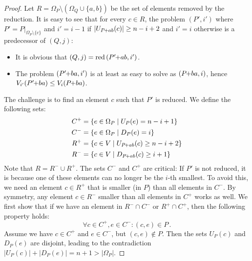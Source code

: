 \documentclass[twoside,leqno,twocolumn]{article}
\newcommand{\pchild}[3]{{#1}\kern-1pt{+}{#2}{#3}}
\newcommand{\reduced}[1]{\operatorname{red}{#1}}
\newcommand{\less}[2]{D_{#1}(#2)}
\newcommand{\greater}[2]{U_{#1}(#2)}
\begin{document}
\begin{proof}
  Let $R = \Omega_P \setminus (\Omega_Q \cup \{a, b\})$ be the set of elements removed by the reduction.
  It is easy to see that for every $c \in R$, the problem $(P', i')$ where $P' = P|_{\Omega_P \setminus \{c\}}$ and $i' = i - 1$ if $|\greater{\pchild{P}{a}{b}}{c}| \ge n - i + 2$ and $i' = i$ otherwise is a predecessor of $(Q, j)$:
  \begin{itemize}
    \item It is obvious that $(Q, j) = \reduced{(\pchild{P'}{a}{b}, i')}$.
    \item The problem $(\pchild{P'}{b}{a}, i')$ is at least as easy to solve as $(\pchild{P}{b}{a}, i)$, hence $V_{i'}(\pchild{P'}{b}{a}) \leq V_i(\pchild{P}{b}{a})$.
  \end{itemize}
  The challenge is to find an element $c$ such that $P'$ is reduced.
  We define the following sets:
  \begin{align*}
    C^+ & = \{e \in \Omega_P \mid \greater{P}{e} = n - i + 1\}            \\
    C^- & = \{e \in \Omega_P \mid \less{P}{e} = i \}                      \\
    R^+ & = \{c \in V \mid \greater{\pchild{P}{a}{b}}{c} \ge n - i + 2 \} \\
    R^- & = \{c \in V \mid \less{\pchild{P}{a}{b}}{c} \ge i + 1 \}
  \end{align*}
  Note that $R = R^- \cup R^+$.
  The sets $C^-$ and $C^+$ are critical:
  If $P'$ is not reduced, it is because one of these elements can no longer be the $i$-th smallest.
  To avoid this, we need an element $c \in R^+$ that is smaller (in $P$) than all elements in $C^-$.
  By symmetry, any element $c \in R^-$ smaller than all elements in $C^+$ works as well.
  We first show that if we have an element in $R^- \cap C^-$ or $R^+ \cap C^+$, then the following property holds:
  \begin{equation}
    \forall c \in C^+, e \in C^- \colon (c, e) \in P\,\text{.}
  \end{equation}
  Assume we have $c \in C^+$ and $e \in C^-$, but $(c, e) \notin P$.
  Then the sets $\greater{P}{c}$ and $\less{P}{e}$ are disjoint, leading to the contradiction $|\greater{P}{c}| + |\less{P}{e}| = n + 1 > |\Omega_P|$.


\end{proof}
\end{document}
